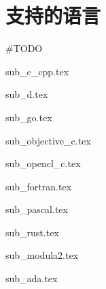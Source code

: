 \section{支持的语言}

\#TODO

{sub_c_cpp.tex}

{sub_d.tex}

{sub_go.tex}

{sub_objective_c.tex}

{sub_opencl_c.tex}

{sub_fortran.tex}

{sub_pascal.tex}

{sub_rust.tex}

{sub_modula2.tex}

{sub_ada.tex}
